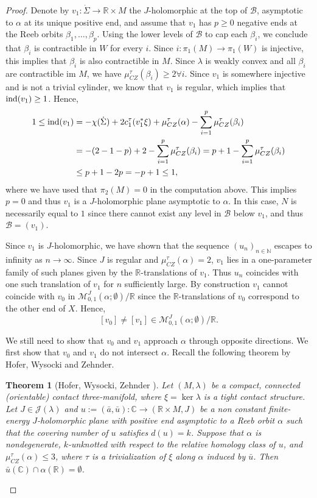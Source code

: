 \documentclass{amsart}
\newcommand{\C}{\mathbb{C}}
\newcommand{\R}{\mathbb{R}}
\newcommand{\N}{\mathbb{N}}
\newtheorem{theorem}{Theorem}[section]
\newcommand{\CZ}{\mu_{CZ}^{\tau}}
\newcommand{\ind}{\textnormal{ind}}
\begin{document}
\begin{proof}
Denote by $v_1:\dot \Sigma \to \R \times M$ the $J$-holomorphic at the top of $\mathcal B$, asymptotic to $\alpha$ at its unique positive end, and assume that $v_1$ has $p\geq 0$ negative ends at the Reeb orbits $\beta_1,\ldots, \beta_p$. Using the lower levels of $\mathcal B$ to cap each $\beta_i$, we conclude that $\beta_i$ is contractible in $W$ for every $i$. Since $i:\pi_1(M)\to \pi_1(W)$ is injective, this implies that $\beta_i$ is also contractible in $M$. Since $\lambda$ is weakly convex and all $\beta_i$ are contractible im $M$, we have $\CZ(\beta_i)\geq 2 \forall i.$ Since $v_1$ is somewhere injective and is not a trivial cylinder, we know that $v_1$ is regular, which implies that $\ind (v_1) \geq 1$. Hence,
$$
\begin{aligned}
1\leq \ind(v_1) & = -\chi(\dot \Sigma) + 2c_1^\tau(v_1^*\xi)+\CZ(\alpha) - \sum_{i=1}^p \CZ(\beta_i) \\& = -(2-1-p)+2-\sum_{i=1}^p \CZ(\beta_i) = p+1-\sum_{i=1}^p \CZ(\beta_i)\\ & \leq p+1-2p =-p+1 \leq 1,
\end{aligned}
$$
where we have used that $\pi_2(M)=0$ in the computation above. This implies $p=0$ and thus $v_1$ is a $J$-holomorphic plane asymptotic to $\alpha$. In this case, $N$ is necessarily equal to $1$ since there cannot exist any level in $\mathcal B$ below $v_1$, and thus $\mathcal B = (v_1).$

Since $v_1$ is $J$-holomorphic, we have shown that the sequence $(u_n)_{n\in \N}$ escapes to infinity as $n\to \infty$. Since $J$ is regular and $\CZ(\alpha)=2$, $v_1$ lies in a one-parameter family of such planes given by the $\R$-translations of $v_1$. Thus $u_n$ coincides with one such translation of $v_1$ for $n$ sufficiently large. By construction $v_1$ cannot coincide with $v_0$ in $\mathcal M^J_{0,1}(\alpha ; \emptyset)/\R$ since the $\R$-translations of $v_0$ correspond to the other end of $X$. Hence, 
\begin{equation}\label{v0neqv1}
    [v_0] \neq [v_1] \in \mathcal M^J_{0,1}(\alpha ; \emptyset) / \R.
\end{equation}

We still need to show that $v_0$ and $v_1$ approach $\alpha$ through opposite directions. We first show that $v_0$ and $v_1$ do not intersect $\alpha$. Recall the following theorem by Hofer, Wysocki and Zehnder.

\begin{theorem}[Hofer, Wysocki, Zehnder {\cite[Theorem 1.3]{prop2}}] \label{prop2,thm1.3}
Let $(M,\lambda)$ be a compact, connected (orientable) contact three-manifold, where $\xi = \ker \lambda$ is a tight contact structure. Let $J \in \mathcal{J}(\lambda)$ and $u:=(\bar{a},\bar{u}):\C \to (\R \times M,J)$ be a non constant finite-energy $J$-holomorphic plane with positive end asymptotic to a Reeb orbit $\alpha$ such that the covering number of $u$ satisfies $d(u)=k$. Suppose that $\alpha$ is nondegenerate, $k$-unknotted with respect to the relative homology class of $u$, and $\CZ(\alpha)\leq 3$, where $\tau$ is a trivialization of $\xi$ along $\alpha$ induced by $\bar u$. Then $\bar{u}(\C) \cap \alpha(\R)=\emptyset$.
\end{theorem}


\end{proof}
\end{document}
